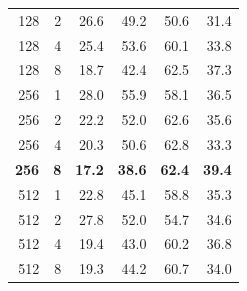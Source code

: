\documentclass[12pt,oneside]{book} %
\begin{document}
\begin{table}[H]
\begin{adjustbox}{width=0.6\textwidth}
\begin{tabular}{rrrrrr}
            128                  & 2                     & 26.6               & 49.2               & 50.6               & 31.4               \\
            128                  & 4                     & 25.4               & 53.6               & 60.1               & 33.8               \\
            128                  & 8                     & 18.7               & 42.4               & 62.5               & 37.3               \\
            256                  & 1                     & 28.0               & 55.9               & 58.1               & 36.5               \\
            256                  & 2                     & 22.2               & 52.0               & 62.6               & 35.6               \\
            256                  & 4                     & 20.3               & 50.6               & 62.8               & 33.3               \\
            \textbf{256}         & \textbf{8}            & \textbf{17.2}      & \textbf{38.6}      & \textbf{62.4}      & \textbf{39.4}      \\
            512                  & 1                     & 22.8               & 45.1               & 58.8               & 35.3               \\
            512                  & 2                     & 27.8               & 52.0               & 54.7               & 34.6               \\
            512                  & 4                     & 19.4               & 43.0               & 60.2               & 36.8               \\
            512                  & 8                     & 19.3               & 44.2               & 60.7               & 34.0               \\
            \bottomrule
        \end{tabular}
    \end{adjustbox}
    \label{tab:new-dataset-adjusted-header}
\end{table}
\end{document}
